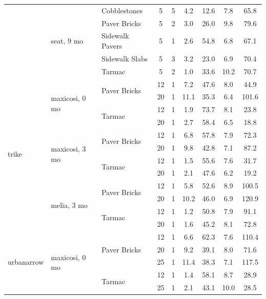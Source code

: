 \documentclass[a4paper]{article}
\begin{document}
\begin{table}
\begin{tabular}{lllcccccc}
\cline{2-9} \cline{3-9}
 & \multirow[t]{5}{*}{seat, 9 mo} & Cobblestones & 5 & 5 & 4.2 & 12.6 & 7.8 & 65.8 \\
\cline{3-9}
 &  & Paver Bricks & 5 & 2 & 3.0 & 26.0 & 9.8 & 79.6 \\
\cline{3-9}
 &  & Sidewalk Pavers & 5 & 1 & 2.6 & 54.8 & 6.8 & 67.1 \\
\cline{3-9}
 &  & Sidewalk Slabs & 5 & 3 & 3.2 & 23.0 & 6.9 & 70.4 \\
\cline{3-9}
 &  & Tarmac & 5 & 2 & 1.0 & 33.6 & 10.2 & 70.7 \\
\cline{1-9} \cline{2-9} \cline{3-9}
\multirow[t]{12}{*}{trike} & \multirow[t]{4}{*}{maxicosi, 0 mo} & \multirow[t]{2}{*}{Paver Bricks} & 12 & 1 & 7.2 & 47.6 & 8.0 & 44.9 \\
 &  &  & 20 & 1 & 11.1 & 35.3 & 6.4 & 101.6 \\
\cline{3-9}
 &  & \multirow[t]{2}{*}{Tarmac} & 12 & 1 & 1.9 & 73.7 & 8.1 & 23.8 \\
 &  &  & 20 & 1 & 2.7 & 58.4 & 6.5 & 18.8 \\
\cline{2-9} \cline{3-9}
 & \multirow[t]{4}{*}{maxicosi, 3 mo} & \multirow[t]{2}{*}{Paver Bricks} & 12 & 1 & 6.8 & 57.8 & 7.9 & 72.3 \\
 &  &  & 20 & 1 & 9.8 & 42.8 & 7.1 & 87.2 \\
\cline{3-9}
 &  & \multirow[t]{2}{*}{Tarmac} & 12 & 1 & 1.5 & 55.6 & 7.6 & 31.7 \\
 &  &  & 20 & 1 & 2.1 & 47.6 & 6.2 & 19.2 \\
\cline{2-9} \cline{3-9}
 & \multirow[t]{4}{*}{melia, 3 mo} & \multirow[t]{2}{*}{Paver Bricks} & 12 & 1 & 5.8 & 52.6 & 8.9 & 100.5 \\
 &  &  & 20 & 1 & 10.2 & 46.0 & 6.9 & 120.9 \\
\cline{3-9}
 &  & \multirow[t]{2}{*}{Tarmac} & 12 & 1 & 1.2 & 50.8 & 7.9 & 91.1 \\
 &  &  & 20 & 1 & 1.6 & 45.2 & 8.1 & 72.8 \\
\cline{1-9} \cline{2-9} \cline{3-9}
\multirow[t]{15}{*}{urbanarrow} & \multirow[t]{5}{*}{maxicosi, 0 mo} & \multirow[t]{3}{*}{Paver Bricks} & 12 & 1 & 6.6 & 62.3 & 7.6 & 110.4 \\
 &  &  & 20 & 1 & 9.2 & 39.1 & 8.0 & 71.6 \\
 &  &  & 25 & 1 & 11.4 & 38.3 & 7.1 & 117.5 \\
\cline{3-9}
 &  & \multirow[t]{2}{*}{Tarmac} & 12 & 1 & 1.4 & 58.1 & 8.7 & 28.9 \\
 &  &  & 25 & 1 & 2.1 & 43.1 & 10.0 & 28.5 \\

\end{tabular}
\end{table}
\end{document}
